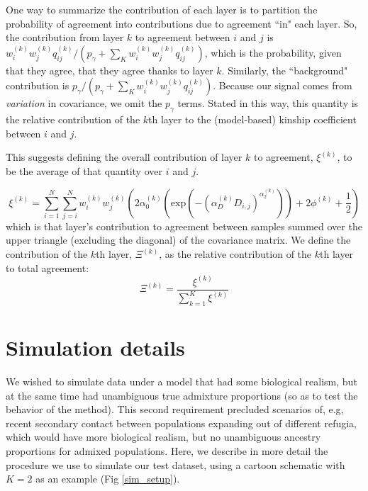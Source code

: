 \documentclass[12pt]{article}
\begin{document}
One way to summarize the contribution of each layer is to partition the probability of agreement
into contributions due to agreement ``in" each layer.
So, the contribution from layer $k$ to agreement between $i$ and $j$ is 
$w_i^{(k)} w_j^{(k)} q^{(k)}_{ij} / (p_\gamma + \sum_K w_i^{(k)} w_j^{(k)} q^{(k)}_{ij})$,
which is the probability, given that they agree, that they agree thanks to layer $k$.
Similarly, the ``background" contribution is $p_\gamma / (p_\gamma + \sum_K w_i^{(k)} w_j^{(k)} q^{(k)}_{ij})$.
Because our signal comes from \emph{variation} in covariance, we omit
the $p_\gamma$ terms. 
Stated in this way, this quantity is the
relative contribution of the $k$th layer to the (model-based) kinship
coefficient between $i$ and $j$.

This suggests defining the overall contribution of layer $k$ to agreement, $\xi^{(k)}$, 
to be the average of that quantity over $i$ and $j$.

%
\begin{equation}
\xi^{(k)} = 
	\sum\limits_{i=1}^{N}
		\sum\limits_{j=i}^N
			w^{(k)}_iw^{(k)}_j 
				\left(	
					2\alpha^{(k)}_0 
						\left( \text{exp} 
							\left( -(\alpha^{(k)}_D D_{i,j}) ^ {\alpha^{(k)}_2}\right) 
						\right) + 2\phi^{(k)} + \frac{1}{2}
				\right)
\label{layer_contribution}
\end{equation}
%
which is that layer's contribution to agreement between samples 
summed over the upper triangle (excluding the diagonal) of the covariance matrix.
We define the contribution of the $k$th layer, $\Xi^{(k)}$, 
as the relative contribution of the $k$th layer to total agreement:
%
\begin{equation}
\Xi^{(k)} = 
\frac{\xi^{(k)}}
	{\sum\limits_{k=1}^{K}
	    	\xi^{(k)}}
\label{rel_layer_contribution}
\end{equation}
%

\newpage
\section{Simulation details}\label{sim_details}
We wished to simulate data under a model that had some biological realism, 
but at the same time had unambiguous true admixture proportions 
(so as to test the behavior of the method).
This second requirement precluded scenarios of, e.g, 
recent secondary contact between populations expanding out of different refugia, 
which would have more biological realism, 
but no unambiguous ancestry proportions for admixed populations.
Here, we describe in more detail the procedure we use to simulate our test dataset, 
using a cartoon schematic with $K=2$ as an example (Fig \ref{sim_setup}).
\end{document}
